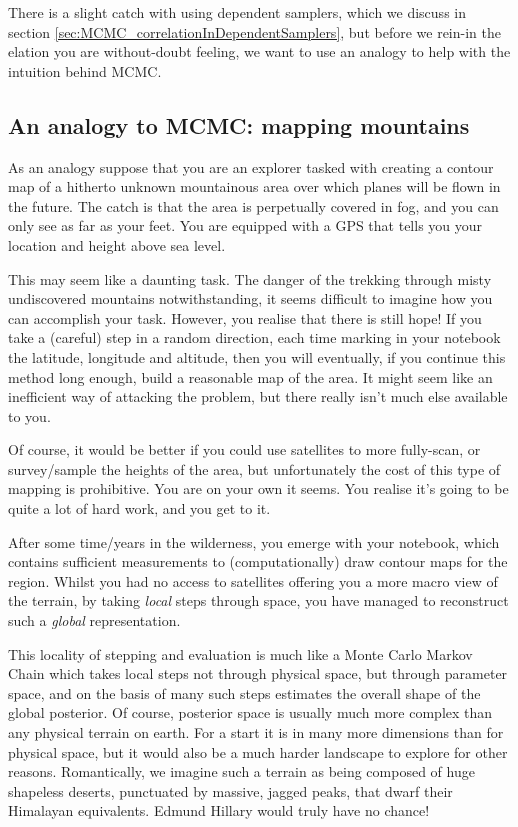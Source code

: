\documentclass[11pt,fullpage]{book}
\begin{document}
There is a slight catch with using dependent samplers, which we discuss in section \ref{sec:MCMC_correlationInDependentSamplers}, but before we rein-in the elation you are without-doubt feeling, we want to use an analogy to help with the intuition behind MCMC.

\subsection{An analogy to MCMC: mapping mountains}
As an analogy suppose that you are an explorer tasked with creating a contour map of a hitherto unknown mountainous area over which planes will be flown in the future. The catch is that the area is perpetually covered in fog, and you can only see as far as your feet. You are equipped with a GPS that tells you your location and height above sea level.

This may seem like a daunting task. The danger of the trekking through misty undiscovered mountains notwithstanding, it seems difficult to imagine how you can accomplish your task. However, you realise that there is still hope! If you take a (careful) step in a random direction, each time marking in your notebook the latitude, longitude and altitude, then you will eventually, if you continue this method long enough, build a reasonable map of the area. It might seem like an inefficient way of attacking the problem, but there really isn't much else available to you. 

Of course, it would be better if you could use satellites to more fully-scan, or survey/sample the heights of the area, but unfortunately the cost of this type of mapping is prohibitive. You are on your own it seems. You realise it's going to be quite a lot of hard work, and you get to it. 

After some time/years in the wilderness, you emerge with your notebook, which contains sufficient measurements to (computationally) draw contour maps for the region. Whilst you had no access to satellites offering you a more macro view of the terrain, by taking \textit{local} steps through space, you have managed to reconstruct such a \textit{global} representation. 

This locality of stepping and evaluation is much like a Monte Carlo Markov Chain which takes local steps not through physical space, but through parameter space, and on the basis of many such steps estimates the overall shape of the global posterior. Of course, posterior space is usually much more complex than any physical terrain on earth. For a start it is in many more dimensions than for physical space, but it would also be a much harder landscape to explore for other reasons.  Romantically, we imagine such a terrain as being composed of huge shapeless deserts, punctuated by massive, jagged peaks, that dwarf their Himalayan equivalents. Edmund Hillary would truly have no chance!
\end{document}
